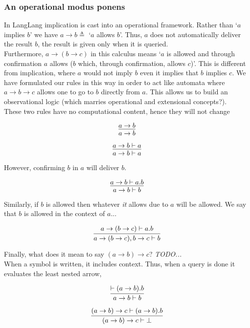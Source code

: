 \documentclass[a4paper,11pt]{article}
\begin{document}
\subsubsection{An operational modus ponens}

In LangLang implication is cast into an operational framework.
Rather than `$a$ implies $b$' we have $a \rightarrow b \triangleq$ `$a$ allows $b$'.
Thus, $a$ does not automatically deliver the result $b$, the result is given only when it is queried.\\

Furthermore, $a \rightarrow (b \rightarrow c)$ in this calculus means `$a$ is allowed and through confirmation $a$ allows ($b$ which, through confirmation, allows $c$)'.
This is different from implication, where $a$ would not imply $b$ even it implies that $b$ implies $c$.
We have formulated our rules in this way in order to act like automata where $a \rightarrow b \rightarrow c$ allows one to go to $b$ directly from $a$.
This allows us to build an observational logic {\color{gray}(which marries operational and extensional concepts?)}.\\

These two rules have no computational content, hence they will not change

\[
\infer{a \rightarrow b}{a \rightarrow b}
\]

\[
\infer{a \rightarrow b \vdash a}{a \rightarrow b \vdash a}
\]

However, confirming $b$ in $a$ will deliver $b$.

\[
\infer{a \rightarrow b \vdash b}{a \rightarrow b \vdash a.b}
\]

Similarly, if $b$ is allowed then whatever \emph{it} allows due to $a$ will be allowed. We say that $b$ is allowed in the context of $a$...

\[
\infer{a \rightarrow (b \rightarrow c), b \rightarrow c \vdash b}{a \rightarrow (b \rightarrow c) \vdash a.b}
\]

Finally, what does it mean to say $(a \rightarrow b) \rightarrow c$? {\color{gray}\emph{TODO...}}\\

When a symbol is written, it includes context. Thus, when a query is done it evaluates the least nested arrow,

\[
\infer{a \rightarrow b \vdash b}{\vdash (a \rightarrow b).b}
\]

\[
\infer{(a \rightarrow b) \rightarrow c \vdash \bot}{(a \rightarrow b) \rightarrow c \vdash (a \rightarrow b).b}
\]
\end{document}
